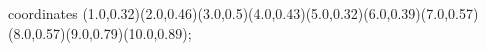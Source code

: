 					coordinates { (1.0,0.32)(2.0,0.46)(3.0,0.5)(4.0,0.43)(5.0,0.32)(6.0,0.39)(7.0,0.57)(8.0,0.57)(9.0,0.79)(10.0,0.89)};